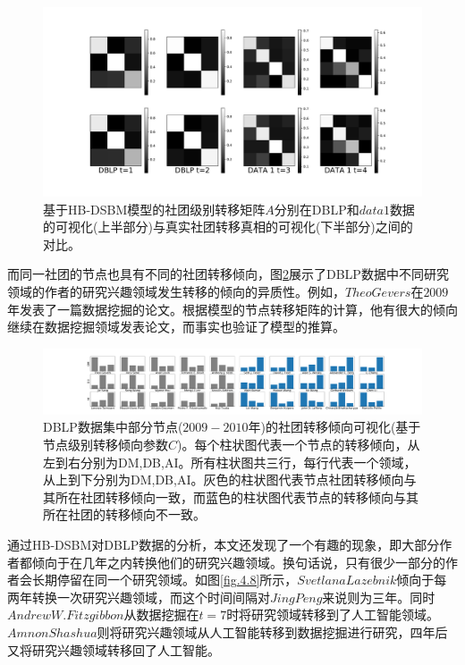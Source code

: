 \begin{figure}[htbp]
	\centering
	\includegraphics[width=.8\textwidth]{./figure/communityHeatMapt.pdf}
	\caption{基于HB-DSBM模型的社团级别转移矩阵$A$分别在DBLP和$data1$数据的可视化(上半部分)与真实社团转移真相的可视化(下半部分)之间的对比。}
	\label{fig.4.6}
\end{figure}


而同一社团的节点也具有不同的社团转移倾向，图\ref{fig.4.7}展示了DBLP数据中不同研究领域的作者的研究兴趣领域发生转移的倾向的异质性。例如，$Theo Gevers$在$2009$年发表了一篇数据挖掘的论文。根据模型的节点转移矩阵的计算，他有很大的倾向继续在数据挖掘领域发表论文，而事实也验证了模型的推算。
\begin{figure}[htbp]
	\includegraphics[width=\textwidth]{./figure/nodes_compare.pdf}
	\caption{DBLP数据集中部分节点($2009-2010$年)的社团转移倾向可视化(基于节点级别转移倾向参数$C$)。每个柱状图代表一个节点的转移倾向，从左到右分别为DM,DB,AI。所有柱状图共三行，每行代表一个领域，从上到下分别为DM,DB,AI。灰色的柱状图代表节点社团转移倾向与其所在社团转移倾向一致，而蓝色的柱状图代表节点的转移倾向与其所在社团的转移倾向不一致。}
	\label{fig.4.7}
\end{figure}

通过HB-DSBM对DBLP数据的分析，本文还发现了一个有趣的现象，即大部分作者都倾向于在几年之内转换他们的研究兴趣领域。换句话说，只有很少一部分的作者会长期停留在同一个研究领域。如图\ref{fig.4.8}所示，$Svetlana Lazebnik$倾向于每两年转换一次研究兴趣领域，而这个时间间隔对$Jing Peng$来说则为三年。同时$Andrew W. Fitzgibbon$从数据挖掘在$t=7$时将研究领域转移到了人工智能领域。$Amnon Shashua$则将研究兴趣领域从人工智能转移到数据挖掘进行研究，四年后又将研究兴趣领域转移回了人工智能。

